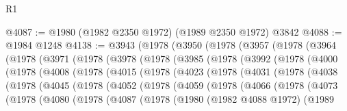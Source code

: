 \begin{lexlean}{R1}
\begin{coremodule}
@4087 := @1980 (@1982 @2350 @1972) (@1989 @2350 @1972) @3842
@4088 := @1984 @1248
@4138 := @3943
    (@1978
      (@3950
        (@1978
          (@3957
            (@1978
              (@3964
                (@1978
                  (@3971
                    (@1978
                      (@3978
                        (@1978
                          (@3985
                            (@1978
                              (@3992
                                (@1978
                                  (@4000
                                    (@1978
                                      (@4008
                                        (@1978
                                          (@4015
                                            (@1978
                                              (@4023
                                                (@1978
                                                  (@4031
                                                    (@1978
                                                      (@4038
                                                        (@1978
                                                          (@4045
                                                            (@1978
                                                              (@4052
                                                                (@1978
                                                                  (@4059
                                                                    (@1978
                                                                      (@4066
                                                                        (@1978
                                                                          (@4073
                                                                            (@1978
                                                                              (@4080
                                                                                (@1978
                                                                                  (@4087
                                                                                    (@1978
                                                                                      (@1980
                                                                                        (@1982
                                                                                          @4088
                                                                                          @1972)
                                                                                        (@1989

\end{coremodule}
\end{lexlean}
